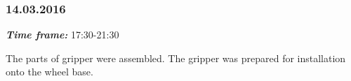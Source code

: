 \subsubsection{14.03.2016}
\textit{\textbf{Time frame:}} 17:30-21:30 

The parts of gripper were assembled. The gripper was prepared for installation onto the wheel base.

\begin{figure}[H]
	\begin{minipage}[h]{1\linewidth}
		\caption{}
		\label{Shiftbuc2.8}
	\end{minipage}
\end{figure}

